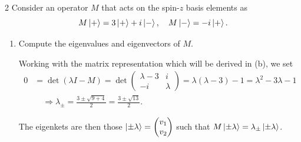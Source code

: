 \documentclass[11pt]{article}
\begin{document}
\begin{problem}{2}
  Consider an operator \( M \) that acts on the spin-\( z \) basis elements as
  \begin{equation}
  \label{eq:2}
  M\ket{+} = 3\ket{+} + i\ket{-}, \quad M\ket{-} = -i \ket{+}.
  \end{equation}
  \begin{enumerate}[label=(\alph*)]
    \item Compute the eigenvalues and eigenvectors of \( M \).
          \begin{answer}
            Working with the matrix representation which will be derived in (b), we set
            \begin{equation}
            \label{eq:22}
            \begin{aligned}
              0 &= \det(\lambda I - M) = \det \begin{pmatrix}
\lambda  -3  & i \\
-i           & \lambda
              \end{pmatrix} = \lambda(\lambda-3) - 1 = \lambda^2 - 3\lambda - 1 \\
              &\quad \Rightarrow \lambda_{\pm} = \frac{3 \pm \sqrt{9 + 4}}{2} = \frac{3 \pm \sqrt{13}}{2}.
            \end{aligned}
            \end{equation}

            The eigenkets are then those \( \ket{\pm \lambda} = \begin{pmatrix} v_1 \\ v_2 \end{pmatrix} \) such that \( M\ket{\pm\lambda} = \lambda_{\pm} \ket{\pm\lambda} \).


\end{answer}
\end{enumerate}
\end{problem}
\end{document}
